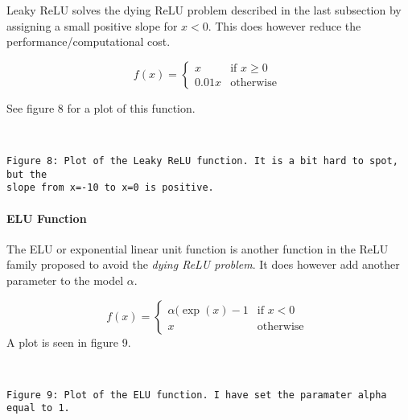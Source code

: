 \documentclass[11pt]{article}
\begin{document}
Leaky ReLU solves the dying ReLU problem described in the last
subsection by assigning a small positive slope for \(x < 0\). This does
however reduce the performance/computational cost.

\[
f(x) =
\left\{
    \begin{array}{ll}
        x  & \mbox{if } x \geq 0 \\
        0.01x & \mbox{otherwise }
    \end{array}
\right.
\]

See figure 8 for a plot of this function.

    \begin{center}
    \end{center}
    { \hspace*{\fill} \\}
    
    \begin{Verbatim}[commandchars=\\\{\}]
Figure 8: Plot of the Leaky ReLU function. It is a bit hard to spot, but the
slope from x=-10 to x=0 is positive.
    \end{Verbatim}

    \hypertarget{elu-function}{%
\paragraph{ELU Function}\label{elu-function}}

The ELU or exponential linear unit function is another function in the
ReLU family proposed to avoid the \emph{dying ReLU problem}. It does
however add another parameter to the model \(\alpha\).

\[
f(x) =
\left\{
    \begin{array}{ll}
        \alpha(\exp(x)-1  & \mbox{if } x < 0 \\
        x & \mbox{otherwise }
    \end{array}
\right.
\] 
A plot is seen in figure 9.

    \begin{center}
    \end{center}
    { \hspace*{\fill} \\}
    
    \begin{Verbatim}[commandchars=\\\{\}]
Figure 9: Plot of the ELU function. I have set the paramater alpha equal to 1.
    \end{Verbatim}
\end{document}
